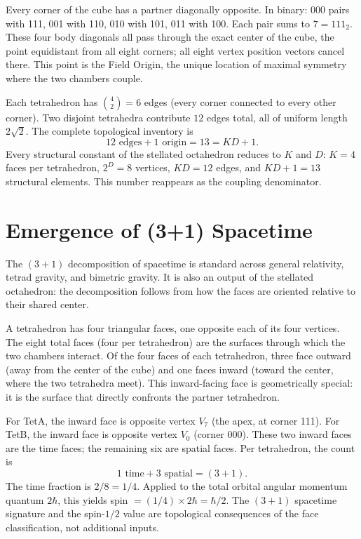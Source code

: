 \documentclass[twocolumn]{iopjournal}
\begin{document}
Every corner of the cube has a partner diagonally opposite. In binary: 000 pairs with 111, 001 with 110, 010 with 101, 011 with 100. Each pair sums to $7 = 111_2$. These four body diagonals all pass through the exact center of the cube, the point equidistant from all eight corners; all eight vertex position vectors cancel there. This point is the Field Origin, the unique location of maximal symmetry where the two chambers couple.

Each tetrahedron has $\binom{4}{2} = 6$ edges (every corner connected to every other corner). Two disjoint tetrahedra contribute $12$ edges total, all of uniform length $2\sqrt{2}$. The complete topological inventory is
\begin{equation}
12 \text{ edges} + 1 \text{ origin} = 13 = KD + 1.
\end{equation}
Every structural constant of the stellated octahedron reduces to $K$ and $D$: $K = 4$ faces per tetrahedron, $2^D = 8$ vertices, $KD = 12$ edges, and $KD + 1 = 13$ structural elements. This number reappears as the coupling denominator.


\section{Emergence of (3+1) Spacetime}
\label{sec:spacetime}

The $(3+1)$ decomposition of spacetime is standard across general relativity, tetrad gravity, and bimetric gravity. It is also an output of the stellated octahedron: the decomposition follows from how the faces are oriented relative to their shared center.

A tetrahedron has four triangular faces, one opposite each of its four vertices. The eight total faces (four per tetrahedron) are the surfaces through which the two chambers interact. Of the four faces of each tetrahedron, three face outward (away from the center of the cube) and one faces inward (toward the center, where the two tetrahedra meet). This inward-facing face is geometrically special: it is the surface that directly confronts the partner tetrahedron.

For TetA, the inward face is opposite vertex $V_7$ (the apex, at corner 111). For TetB, the inward face is opposite vertex $V_0$ (corner 000). These two inward faces are the time faces; the remaining six are spatial faces. Per tetrahedron, the count is
\begin{equation}
1 \text{ time} + 3 \text{ spatial} = (3+1).
\end{equation}
The time fraction is $2/8 = 1/4$. Applied to the total orbital angular momentum quantum $2\hbar$, this yields spin $= (1/4) \times 2\hbar = \hbar/2$. The $(3+1)$ spacetime signature and the spin-$1/2$ value are topological consequences of the face classification, not additional inputs.
\end{document}
